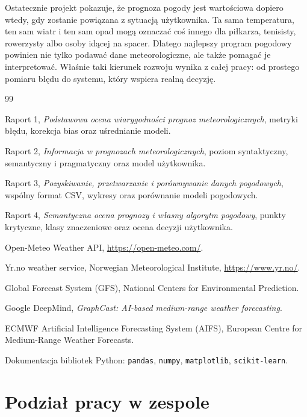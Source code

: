 \documentclass[a4paper,12pt]{article}
\begin{document}
\noindent
Ostatecznie projekt pokazuje, że prognoza pogody jest wartościowa dopiero wtedy,
gdy zostanie powiązana z sytuacją użytkownika. Ta sama temperatura, ten sam wiatr
i ten sam opad mogą oznaczać coś innego dla piłkarza, tenisisty, rowerzysty albo
osoby idącej na spacer. Dlatego najlepszy program pogodowy powinien nie tylko
podawać dane meteorologiczne, ale także pomagać je interpretować. Właśnie taki
kierunek rozwoju wynika z całej pracy: od prostego pomiaru błędu do systemu,
który wspiera realną decyzję.

\begin{thebibliography}{99}

Raport 1, \textit{Podstawowa ocena wiarygodności prognoz meteorologicznych},
metryki błędu, korekcja bias oraz uśrednianie modeli.

Raport 2, \textit{Informacja w prognozach meteorologicznych},
poziom syntaktyczny, semantyczny i pragmatyczny oraz model użytkownika.

Raport 3, \textit{Pozyskiwanie, przetwarzanie i porównywanie danych pogodowych},
wspólny format CSV, wykresy oraz porównanie modeli pogodowych.

Raport 4, \textit{Semantyczna ocena prognozy i własny algorytm pogodowy},
punkty krytyczne, klasy znaczeniowe oraz ocena decyzji użytkownika.

Open-Meteo Weather API, \url{https://open-meteo.com/}.

Yr.no weather service, Norwegian Meteorological Institute,
\url{https://www.yr.no/}.

Global Forecast System (GFS), National Centers for Environmental Prediction.

Google DeepMind, \textit{GraphCast: AI-based medium-range weather forecasting}.

ECMWF Artificial Intelligence Forecasting System (AIFS), European Centre for
Medium-Range Weather Forecasts.

Dokumentacja bibliotek Python: \texttt{pandas}, \texttt{numpy},
\texttt{matplotlib}, \texttt{scikit-learn}.

\end{thebibliography}

\section*{Podział pracy w zespole}
\end{document}
